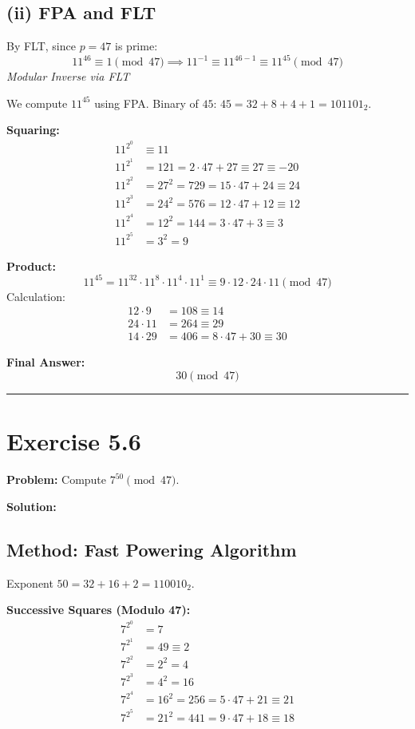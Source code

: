 \subsection*{(ii) FPA and FLT}
By FLT, since $p=47$ is prime:
$$ 11^{46} \equiv 1 \pmod{47} \implies 11^{-1} \equiv 11^{46-1} \equiv 11^{45} \pmod{47} $$
\textit{Modular Inverse via FLT}

We compute $11^{45}$ using FPA.
Binary of $45$: $45 = 32 + 8 + 4 + 1 = 101101_2$.

\textbf{Squaring:}
\begin{align*}
    11^{2^0} &\equiv 11 \\
    11^{2^1} &= 121 = 2 \cdot 47 + 27 \equiv 27 \equiv -20 \\
    11^{2^2} &= 27^2 = 729 = 15 \cdot 47 + 24 \equiv 24 \\
    11^{2^3} &= 24^2 = 576 = 12 \cdot 47 + 12 \equiv 12 \\
    11^{2^4} &= 12^2 = 144 = 3 \cdot 47 + 3 \equiv 3 \\
    11^{2^5} &= 3^2 = 9
\end{align*}

\textbf{Product:}
$$ 11^{45} = 11^{32} \cdot 11^8 \cdot 11^4 \cdot 11^1 \equiv 9 \cdot 12 \cdot 24 \cdot 11 \pmod{47} $$
Calculation:
\begin{align*}
    12 \cdot 9 &= 108 \equiv 14 \\
    24 \cdot 11 &= 264 \equiv 29 \\
    14 \cdot 29 &= 406 = 8 \cdot 47 + 30 \equiv 30
\end{align*}

\textbf{Final Answer:}
$$ 30 \pmod{47} $$

\hrule
\vspace{1cm}
\newpage
\section*{Exercise 5.6}
\textbf{Problem:} Compute $7^{50} \pmod{47}$.

\textbf{Solution:}

\subsection*{Method: Fast Powering Algorithm}
Exponent $50 = 32 + 16 + 2 = 110010_2$.

\textbf{Successive Squares (Modulo 47):}
\begin{align*}
    7^{2^0} &= 7 \\
    7^{2^1} &= 49 \equiv 2 \\
    7^{2^2} &= 2^2 = 4 \\
    7^{2^3} &= 4^2 = 16 \\
    7^{2^4} &= 16^2 = 256 = 5 \cdot 47 + 21 \equiv 21 \\
    7^{2^5} &= 21^2 = 441 = 9 \cdot 47 + 18 \equiv 18
\end{align*}

